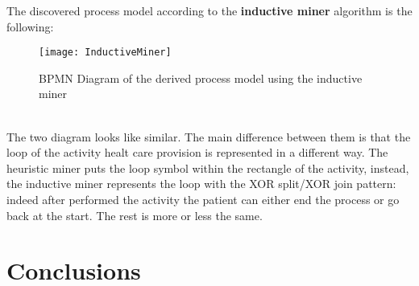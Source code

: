 \documentclass[paper=a4, fontsize=11pt]{scrartcl} %
\numberwithin{equation}{section} %
\numberwithin{figure}{section} %
\numberwithin{table}{section} %
\begin{document}
The discovered process model according to the \textbf{inductive miner} algorithm is the following:
\begin{figure} [htbp]
\centering
\texttt{[image: InductiveMiner]}
\caption{BPMN Diagram of the derived process model using the inductive miner}
\end{figure}\\
The two diagram looks like similar. The main difference between them is that the loop of the activity healt care provision is represented in a different way. The heuristic miner puts the loop symbol within the rectangle of the activity, instead, the inductive miner represents the loop with the XOR split/XOR join pattern: indeed after performed the activity the patient can either end the process or go back at the start. The rest is more or less the same.
\newpage
\section{Conclusions}
\end{document}
